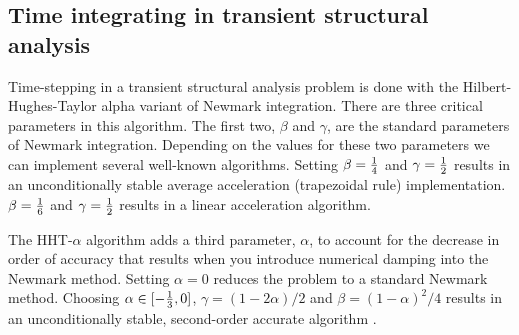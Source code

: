 \subsection{Time integrating in transient structural analysis}
\label{algorithms.analysis}

Time-stepping in a transient structural analysis problem is done with the
Hilbert-Hughes-Taylor alpha variant of Newmark integration.  There are
three critical parameters in this algorithm.  The first two, $\beta$
and $\gamma$, are the standard parameters of Newmark integration.
Depending on the values for these two parameters we can implement
several well-known algorithms.  Setting $\beta = {1 \over 4}$ and 
$\gamma = {1 \over 2}$ results in an unconditionally stable average
acceleration (trapezoidal rule) implementation.  $\beta = {1 \over 6}$ and 
$\gamma = {1 \over 2}$ results in a linear acceleration algorithm.

The HHT-$\alpha$ algorithm adds a third parameter, $\alpha$, to account for the 
decrease in order of accuracy that results when you introduce numerical
damping into the Newmark method.  Setting $\alpha = 0$ reduces the
problem to a standard Newmark method.  Choosing $\alpha \in {[-{1 \over 3}, 0]}$,
$\gamma = (1 - 2\alpha)/2$ and $\beta = (1 - \alpha)^2/4$ results in 
an unconditionally stable, second-order accurate algorithm \cite{hughes:fem}.

